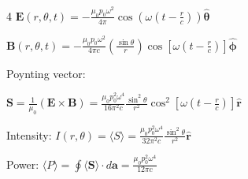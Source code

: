 \documentclass[a4paper,twoside]{article}
\begin{document}
\begin{multicols*}{4}
\(\bm E(r, \theta , t) = -\frac{\mu_0 p_0 \omega^2}{4 \pi}  \cos(\omega(t - \frac{r}{c}))\hat{\bm \theta}\)

\(\bm B(r, \theta , t) = - \frac{\mu_0 p_0 \omega^2}{4 \pi c} (\frac{\sin\theta}{r})\cos[\omega(t - \frac{r}{c})]\hat{\bm \phi}\)


Poynting vector:

\(\bm S = \frac{1}{\mu_0} (\bm E \times \bm B) = \frac{\mu_0 p_0^2 \omega^4}{16 \pi^2 c} \frac{\sin^2\theta}{r^2} \cos^2[\omega(t - \frac{r}{c})]\hat{\bm r}\)  

Intensity:
\(I(r, \theta) = \langle S \rangle = \frac{\mu_0 p_0^2 \omega^4}{32 \pi^2 c} \frac{\sin^2\theta}{r^2}\hat{\bm r}\)   

Power:
\(\langle P \rangle = \oint \langle \bm S \rangle \cdot d\bm a = \frac{\mu_0 p_0^2 \omega^4}{12 \pi c}\)













\end{multicols*}
\end{document}
